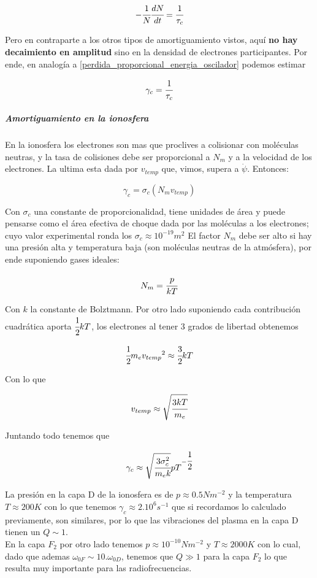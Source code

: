 \documentclass[a4paper,spanish]{article}
\numberwithin{equation}{section}
\begin{document}
\[-\cfrac{1}{N}\cfrac{dN}{dt}=\cfrac{1}{\tau_c}\]

Pero en contraparte a los otros tipos de amortiguamiento vistos, aqu\'i \textbf{no hay decaimiento en amplitud} sino en la densidad de electrones participantes. Por ende, en analog\'ia a \ref{perdida_proporcional_energia_oscilador} podemos estimar 

\[\gamma_c=\cfrac{1}{\tau_c}\]

\subparagraph*{Amortiguamiento en la ionosfera}
En la ionosfera los electrones son mas que proclives a colisionar con mol\'eculas neutras, y la tasa de colisiones debe ser proporcional a $N_m$ y a la velocidad de los electrones. La ultima esta dada por $v_{temp}$ que, vimos, supera a $\dot{\psi}$. Entonces:

\begin{equation}
\gamma_c=\sigma_c\left(N_mv_{temp}\right)
\end{equation}

Con $\sigma_c$ una constante de proporcionalidad, tiene unidades de \'area y puede pensarse como el \'area efectiva de choque dada por las mol\'eculas a los electrones; cuyo valor experimental ronda los $\sigma_c\approx 10^{-19} m^2$ El factor $N_m$ debe ser alto si hay una presi\'on alta y temperatura baja (son mol\'eculas neutras de la atm\'osfera), por ende suponiendo gases ideales:

\begin{equation}
N_m=\cfrac{p}{kT}
\end{equation} 

Con $k$ la constante de Bolztmann. Por otro lado suponiendo cada contribuci\'on cuadr\'atica aporta $\cfrac{1}{2}kT$, los electrones al tener 3 grados de libertad obtenemos

\[\cfrac{1}{2}m_e{v_{temp}}^2\approx \cfrac{3}{2}kT\]

Con lo que

\begin{equation}
v_{temp}\approx \sqrt{\cfrac{3kT}{m_e}}
\end{equation}

Juntando todo tenemos que 

\[\gamma_c\approx \sqrt{\cfrac{3\sigma_c ^2}{m_ek}}pT^{-\cfrac{1}{2}}\]

La presi\'on en la capa D de la ionosfera es de $p\approx0.5 N m^{-2}$ y la temperatura $T\approx 200 K$ con lo que tenemos $\gamma_c \approx 2.10^6 s^{-1}$ que si recordamos lo calculado previamente, son similares, por lo que las vibraciones del plasma en la capa D tienen un $Q\sim 1$.\\
En la capa $F_2$ por otro lado tenemos $p\approx 10^{-10} N m^{-2}$ y $T\approx 2000 K$ con lo cual, dado que ademas $\omega_{0F} \sim 10. \omega_{0D}$, tenemos que $Q \gg 1$ para la capa $F_2$ lo que resulta muy importante para las radiofrecuencias.
\end{document}

